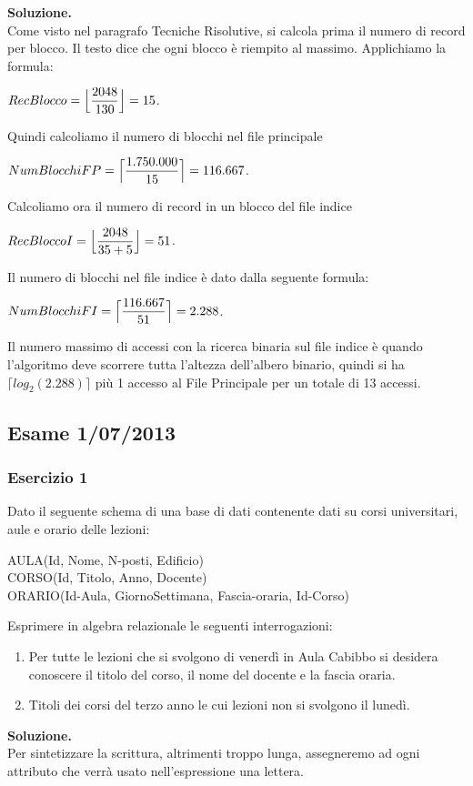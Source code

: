 \noindent\textbf{\fontsize{14pt}{1em}Soluzione.}\\
Come visto nel paragrafo Tecniche Risolutive, si calcola prima il numero di record per blocco. Il testo dice che 
ogni blocco è riempito al massimo. Applichiamo la formula:
\begin{center}
 $RecBlocco = \Bigl\lfloor \dfrac{2048}{130} \Bigr\rfloor = 15$.\\
\end{center}
Quindi calcoliamo il numero di blocchi nel file principale
\begin{center}
 $NumBlocchiFP = \Bigl\lceil \dfrac{1.750.000}{15} \Bigr\rceil = 116.667$.\\
\end{center}
Calcoliamo ora il numero di record in un blocco del file indice
\begin{center}
 $RecBloccoI = \Bigl\lfloor \dfrac{2048}{35+5} \Bigr\rfloor = 51$.\\
\end{center}
Il numero di blocchi nel file indice è dato dalla seguente formula:
\begin{center}
  $NumBlocchiFI= \Bigl\lceil \dfrac{116.667}{51} \Bigr\rceil = 2.288$.\\
\end{center}
Il numero massimo di accessi con la ricerca binaria sul file indice è quando l'algoritmo deve scorrere tutta l'altezza
dell'albero binario, quindi si ha $\lceil log_2(2.288)\rceil$ più 1 accesso al File Principale per un totale di 13 accessi.

\newpage
\subsection{Esame 1/07/2013}
  \subsubsection{Esercizio 1}
  Dato il seguente schema di una base di dati contenente dati su corsi universitari, aule e orario delle lezioni:
  \begin{center}
  AULA(Id, Nome, N-posti, Edificio)\\
  CORSO(Id, Titolo, Anno, Docente)\\ 
  ORARIO(Id-Aula, GiornoSettimana, Fascia-oraria, Id-Corso)\\
  \end{center}

  Esprimere in algebra relazionale le seguenti interrogazioni:
  \begin{enumerate}
   \item Per tutte le lezioni che si svolgono di venerdì in Aula Cabibbo si desidera conoscere il titolo del corso,
   il nome del docente e la fascia oraria.
   \item Titoli dei  corsi del terzo anno le cui lezioni non si svolgono il lunedì. 
  \end{enumerate}
  \noindent\textbf{\fontsize{14pt}{1em}Soluzione.}\\
  Per sintetizzare la scrittura, altrimenti troppo lunga, assegneremo ad ogni attributo che verrà usato
  nell'espressione una lettera.
  

